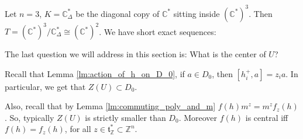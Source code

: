 \begin{example}\label{ex:diagonal_in_C3}
Let $n=3$, $K=\mathbb{C}^*_\Delta$ be the diagonal copy of $\mathbb{C}^*$ sitting inside $(\mathbb{C}^*)^3$. Then $T=(\mathbb{C}^*)^3/\mathbb{C}^*_\Delta\cong (\mathbb{C}^*)^2$. We have short exact sequences:




\end{example}

The last question we will address in this section is: What is the center of $U$?

Recall that Lemma \ref{lm:action_of_h_on_D_0}, if $a\in D_0$, then $[h_i^+,a]=z_ia$. In particular, we get that $Z(U)\subset D_0$.

Also, recall that by Lemma \ref{lm:commuting_poly_and_m} $f(h)m^z=m^zf_z(h)$. So, typically $Z(U)$ is strictly smaller than $D_0$.  Moreover $f(h)$ is central iff $f(h)=f_z(h)$, for all $z\in\mathfrak{t}^*_{\mathbb{Z}}\subset \mathbb{Z}^n$.

